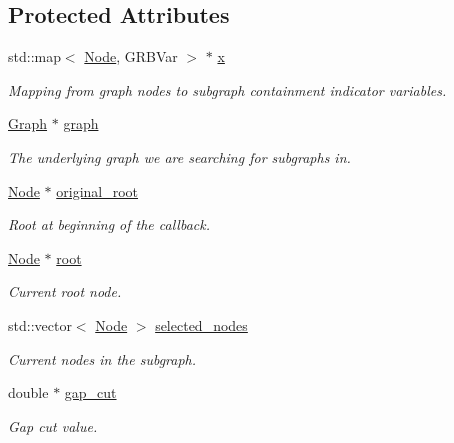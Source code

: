 \subsection*{Protected Attributes}
\begin{DoxyCompactItemize}
\item 
std\+::map$<$ \hyperlink{namespacederegnet_a744bad34f2de9856d36715a445f027f3}{Node}, G\+R\+B\+Var $>$ $\ast$ \hyperlink{classderegnet_1_1LazyConstraintCallback_a48d0e4065232a6dca6e10fe416be755f}{x}
\begin{DoxyCompactList}\small\item\em Mapping from graph nodes to subgraph containment indicator variables. \end{DoxyCompactList}\item 
\hyperlink{namespacederegnet_a55b76c55bbabc682cbc61f8b9948799e}{Graph} $\ast$ \hyperlink{classderegnet_1_1LazyConstraintCallback_af481c9d68dea2dab035e1f2f79cda4d5}{graph}
\begin{DoxyCompactList}\small\item\em The underlying graph we are searching for subgraphs in. \end{DoxyCompactList}\item 
\hyperlink{namespacederegnet_a744bad34f2de9856d36715a445f027f3}{Node} $\ast$ \hyperlink{classderegnet_1_1LazyConstraintCallback_a0ced82ab9f112cbb3e1df10a84be6c64}{original\+\_\+root}
\begin{DoxyCompactList}\small\item\em Root at beginning of the callback. \end{DoxyCompactList}\item 
\hyperlink{namespacederegnet_a744bad34f2de9856d36715a445f027f3}{Node} $\ast$ \hyperlink{classderegnet_1_1LazyConstraintCallback_aa4df18debaaf3aaace54a48b0c3e56ca}{root}
\begin{DoxyCompactList}\small\item\em Current root node. \end{DoxyCompactList}\item 
std\+::vector$<$ \hyperlink{namespacederegnet_a744bad34f2de9856d36715a445f027f3}{Node} $>$ \hyperlink{classderegnet_1_1LazyConstraintCallback_a5ddc4662e6e5c9f1d191c15edbefaa9b}{selected\+\_\+nodes}
\begin{DoxyCompactList}\small\item\em Current nodes in the subgraph. \end{DoxyCompactList}\item 
double $\ast$ \hyperlink{classderegnet_1_1LazyConstraintCallback_a6a139307165523fa944e393e01aeec47}{gap\+\_\+cut}
\begin{DoxyCompactList}\small\item\em Gap cut value. \end{DoxyCompactList}\end{DoxyCompactItemize}
